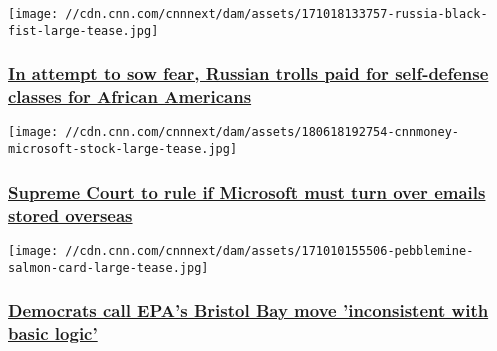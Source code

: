 \href{http://money.cnn.com/2017/10/18/media/black-fist-russia-self-defense-classes/index.html}{}

\texttt{[image: //cdn.cnn.com/cnnnext/dam/assets/171018133757-russia-black-fist-large-tease.jpg]}

\hypertarget{in-attempt-to-sow-fear-russian-trolls-paid-for-self-defense-classes-for-african-americans}{%
\subsubsection{\texorpdfstring{\href{http://money.cnn.com/2017/10/18/media/black-fist-russia-self-defense-classes/index.html}{In
attempt to sow fear, Russian trolls paid for self-defense classes for
African
Americans}}{In attempt to sow fear, Russian trolls paid for self-defense classes for African Americans}}\label{in-attempt-to-sow-fear-russian-trolls-paid-for-self-defense-classes-for-african-americans}}

\href{http://money.cnn.com/2017/10/16/technology/business/supreme-court-microsoft/index.html}{}

\texttt{[image: //cdn.cnn.com/cnnnext/dam/assets/180618192754-cnnmoney-microsoft-stock-large-tease.jpg]}

\hypertarget{supreme-court-to-rule-if-microsoft-must-turn-over-emails-stored-overseas}{%
\subsubsection{\texorpdfstring{\href{http://money.cnn.com/2017/10/16/technology/business/supreme-court-microsoft/index.html}{Supreme
Court to rule if Microsoft must turn over emails stored
overseas}}{Supreme Court to rule if Microsoft must turn over emails stored overseas}}\label{supreme-court-to-rule-if-microsoft-must-turn-over-emails-stored-overseas}}

\href{/2017/10/11/politics/congressional-letter-bristol-bay-salmon/index.html}{}

\texttt{[image: //cdn.cnn.com/cnnnext/dam/assets/171010155506-pebblemine-salmon-card-large-tease.jpg]}

\hypertarget{democrats-call-epas-bristol-bay-move-inconsistent-with-basic-logic}{%
\subsubsection{\texorpdfstring{\href{/2017/10/11/politics/congressional-letter-bristol-bay-salmon/index.html}{Democrats
call EPA's Bristol Bay move 'inconsistent with basic
logic'}}{Democrats call EPA's Bristol Bay move 'inconsistent with basic logic'}}\label{democrats-call-epas-bristol-bay-move-inconsistent-with-basic-logic}}

